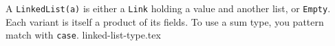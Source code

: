 \begin{blocksection}
    A \lstinline{LinkedList(a)} is either a \lstinline{Link} holding a value and another list, or \lstinline{Empty}. 
    Each variant is itself a product of its fields. To use a sum type, you pattern match with \lstinline{case}.
    {linked-list-type.tex}
\end{blocksection}